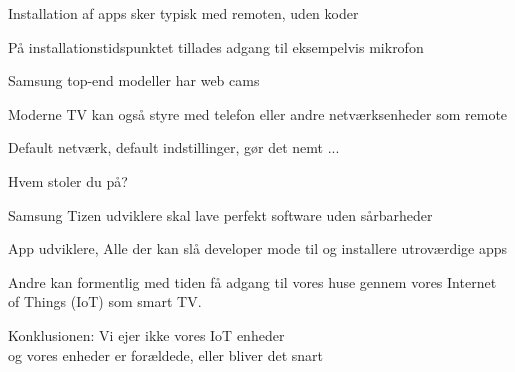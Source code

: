 \documentclass[20pt,landscape,a4paper,footrule]{foils}
\begin{document}


\begin{list1}
\item Installation af apps sker typisk med remoten, uden koder
\item På installationstidspunktet tillades adgang til eksempelvis mikrofon
\item Samsung top-end modeller har web cams
\item Moderne TV kan også styre med telefon eller andre netværksenheder som remote
\item Default netværk, default indstillinger, gør det nemt ...
\end{list1}



\begin{list2}
\item Hvem stoler du på?
\item Samsung Tizen udviklere skal lave perfekt software uden sårbarheder
\item App udviklere, Alle der kan slå developer mode til og installere utroværdige apps
\item Andre kan formentlig med tiden få adgang til vores huse gennem vores Internet of Things (IoT) som smart TV.
\end{list2}

Konklusionen: Vi ejer ikke vores IoT enheder\\
og vores enheder er forældede, eller bliver det snart
\end{document}
